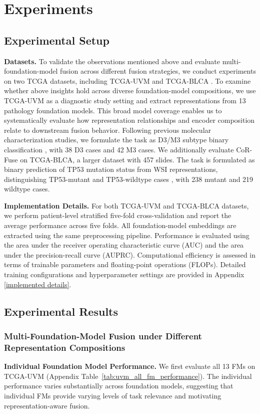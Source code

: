 \section{Experiments}
\subsection{Experimental Setup}
\textbf{Datasets.}
To validate the observations mentioned above and evaluate multi-foundation-model fusion across different fusion strategies, we conduct experiments on two TCGA datasets, including TCGA-UVM \citep{uvmdataset} and TCGA-BLCA \citep{blcatp53mutation}.
To examine whether above insights hold across diverse foundation-model compositions, we use TCGA-UVM as a diagnostic study setting and extract representations from 13 pathology foundation models.
This broad model coverage enables us to systematically evaluate how representation relationships and encoder composition relate to downstream fusion behavior.
Following previous molecular characterization studies, we formulate the task as D3/M3 subtype binary classification \citep{fouruvm}, with 38 D3 cases and 42 M3 cases.
We additionally evaluate CoR-Fuse on TCGA-BLCA, a larger dataset with 457 slides.
The task is formulated as binary prediction of TP53 mutation status from WSI representations, distinguishing TP53-mutant and TP53-wildtype cases \citep{blcatp53mutation}, with 238 mutant and 219 wildtype cases.

\textbf{Implementation Details.}
For both TCGA-UVM and TCGA-BLCA datasets, we perform patient-level stratified five-fold cross-validation and report the average performance across five folds. 
All foundation-model embeddings are extracted using the same preprocessing pipeline.
Performance is evaluated using the area under the receiver operating characteristic curve (AUC) and the area under the precision-recall curve (AUPRC). Computational efficiency is assessed in terms of trainable parameters and floating-point operations (FLOPs).
Detailed training configurations and hyperparameter settings are provided in Appendix \ref{implemented details}.
\subsection{Experimental Results}
\subsubsection{Multi-Foundation-Model Fusion under Different Representation Compositions}
\textbf{Individual Foundation Model Performance.}
We first evaluate all 13 FMs on TCGA-UVM (Appendix Table~\ref{tab:uvm_all_fm_performance}).
The individual performance varies substantially across foundation models, suggesting that individual FMs provide varying levels of task relevance and motivating representation-aware fusion.

